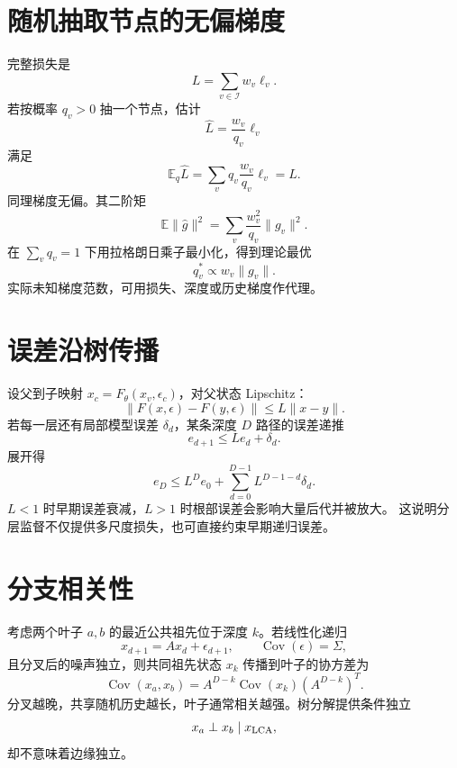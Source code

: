 \documentclass[11pt]{article}
\numberwithin{equation}{section}
\newcommand{\E}{\mathbb{E}}
\newcommand{\1}{\mathbf{1}}
\newcommand{\Cov}{\operatorname{Cov}}
\begin{document}
\section{随机抽取节点的无偏梯度}

完整损失是
\begin{equation}
 L=\sum_{v\in\mathcal I}w_v\ell_v.
\end{equation}
若按概率 $q_v>0$ 抽一个节点，估计
\begin{equation}
 \widehat L=\frac{w_v}{q_v}\ell_v
\end{equation}
满足
\begin{equation}
 \E_q\widehat L=
 \sum_vq_v\frac{w_v}{q_v}\ell_v=L.
\end{equation}
同理梯度无偏。其二阶矩
\begin{equation}
 \E\|\widehat g\|^2
 =\sum_v\frac{w_v^2}{q_v}\|g_v\|^2.
\end{equation}
在 $\sum_vq_v=1$ 下用拉格朗日乘子最小化，得到理论最优
\begin{equation}
 q_v^*\propto w_v\|g_v\|.
\end{equation}
实际未知梯度范数，可用损失、深度或历史梯度作代理。

\section{误差沿树传播}

设父到子映射 $x_c=F_\theta(x_v,\epsilon_c)$，对父状态 Lipschitz：
\begin{equation}
 \|F(x,\epsilon)-F(y,\epsilon)\|
 \le L\|x-y\|.
\end{equation}
若每一层还有局部模型误差 $\delta_d$，某条深度 $D$ 路径的误差递推
\begin{equation}
 e_{d+1}\le Le_d+\delta_d.
\end{equation}
展开得
\begin{equation}
 e_D\le L^De_0+\sum_{d=0}^{D-1}L^{D-1-d}\delta_d.
\end{equation}
$L<1$ 时早期误差衰减，$L>1$ 时根部误差会影响大量后代并被放大。
这说明分层监督不仅提供多尺度损失，也可直接约束早期递归误差。

\section{分支相关性}

考虑两个叶子 $a,b$ 的最近公共祖先位于深度 $k$。若线性化递归
\begin{equation}
 x_{d+1}=Ax_d+\epsilon_{d+1},
 \qquad\Cov(\epsilon)=\Sigma,
\end{equation}
且分叉后的噪声独立，则共同祖先状态 $x_k$ 传播到叶子的协方差为
\begin{equation}
 \Cov(x_a,x_b)=A^{D-k}\Cov(x_k)(A^{D-k})^T.
\end{equation}
分叉越晚，共享随机历史越长，叶子通常相关越强。树分解提供条件独立
\begin{equation}
 x_a\perp x_b\mid x_{\rm LCA},
\end{equation}
却不意味着边缘独立。
\end{document}
